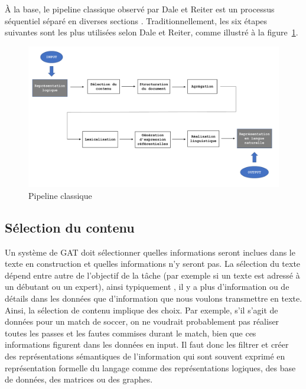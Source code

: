 À la base, le pipeline classique observé par Dale et Reiter est un processus séquentiel séparé en diverses sections \citep{ReiterBuildingNaturalLanguage2000}. Traditionnellement, les six étapes suivantes sont les plus utilisées selon Dale et Reiter, comme illustré à la figure~\ref{fig:Pipeline}.
\begin{figure}[htb] %
	\centering
	\includegraphics[width=1\textwidth, trim = {0cm 0cm 0cm 0cm},clip]{ch2/figs/pipeline.pdf}
	\caption{Pipeline classique}
	\label{fig:Pipeline}
\end{figure}


\subsection{Sélection du contenu}

Un système de \ac{GAT} doit sélectionner quelles informations seront inclues dans le texte en construction et quelles informations n'y seront pas. La sélection du texte dépend entre autre de l'objectif de la tâche (par exemple si un texte est adressé à un débutant ou un expert), ainsi typiquement , il y a plus d'information ou de détails dans les données que d'information que nous voulons transmettre en texte. Ainsi, la sélection de contenu implique des choix. Par exemple, s'il s'agit de données pour un match de soccer, on ne voudrait probablement pas réaliser toutes les passes et les fautes commises durant le match, bien que ces informations figurent dans les données en input. Il faut donc les filtrer et créer des représentations sémantiques de l'information qui sont souvent exprimé en représentation formelle du langage comme des représentations logiques, des base de données, des matrices ou des graphes.

